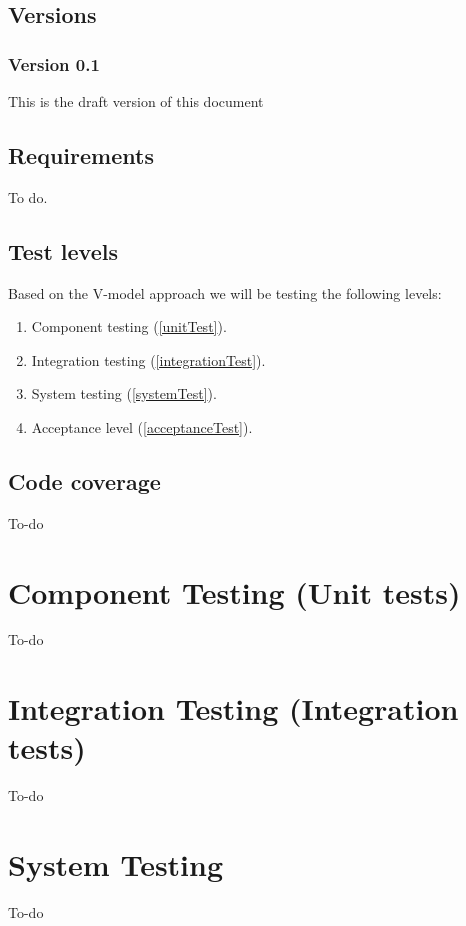 \documentclass[signature]{deltares_manual}
\begin{document}
\section{Versions}
\label{sec:Versions}

\subsection{Version 0.1}
\label{sec:Version}
This is the draft version of this document

\section{Requirements}
\label{sec:requirements}
To do.


\section{Test levels}
\label{sec:testLevels}
Based on the V-model approach we will be testing the following levels:
\begin{enumerate}
\item Component testing (\autoref{unitTest}).
\item Integration testing (\autoref{integrationTest}).
\item System testing (\autoref{systemTest}).
\item Acceptance level (\autoref{acceptanceTest}).
\end{enumerate}

\section{Code coverage}
\label{sec:codeCoverage}
To-do
\chapter{Component Testing (Unit tests)}
\label{unitTest}
To-do

\chapter{Integration Testing (Integration tests)}
\label{integrationTest}
To-do

\chapter{System Testing}
\label{systemTest}
To-do
\end{document}
